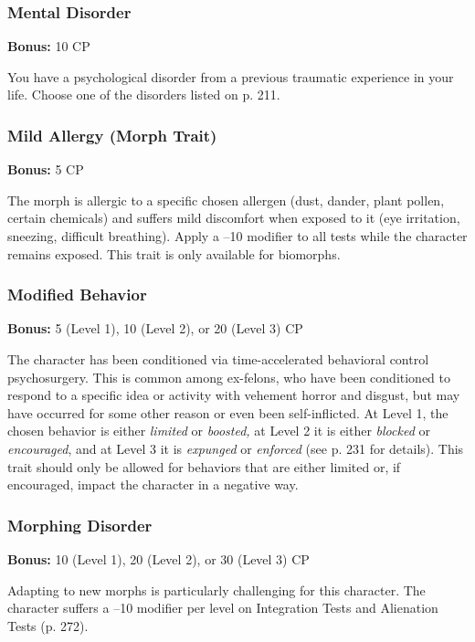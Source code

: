 \subsubsection{Mental Disorder}

\textbf{Bonus:} 10 CP

You have a psychological disorder from a previous 
traumatic experience in your life. Choose one of the 
disorders listed on p. 211.

\subsubsection{Mild Allergy (Morph Trait)}

\textbf{Bonus:} 5 CP

The morph is allergic to a specific chosen allergen 
(dust, dander, plant pollen, certain chemicals) and suffers
mild discomfort when exposed to it (eye irritation,
sneezing, difficult breathing). Apply a –10 modifier to 
all tests while the character remains exposed. This 
trait is only available for biomorphs.

\subsubsection{Modified Behavior}

\textbf{Bonus: }5 (Level 1), 10 (Level 2), or 20 (Level 3) CP

The character has been conditioned via time-accelerated
behavioral control psychosurgery. This is
common among ex-felons, who have been conditioned 
to respond to a specific idea or activity with vehement 
horror and disgust, but may have occurred for some 
other reason or even been self-inflicted. At Level 1, the 
chosen behavior is either \textit{limited} or \textit{boosted,} at Level 
2 it is either \textit{blocked }or \textit{encouraged}, and at Level 3 it 
is \textit{expunged }or \textit{enforced }(see p. 231 for details). This 
trait should only be allowed for behaviors that are 
either limited or, if encouraged, impact the character 
in a negative way.

\subsubsection{Morphing Disorder}

\textbf{Bonus:} 10 (Level 1), 20 (Level 2), or 30 (Level 3) CP

Adapting to new morphs is particularly challenging
for this character. The character suffers a –10
modifier per level on Integration Tests and Alienation
Tests (p. 272).

